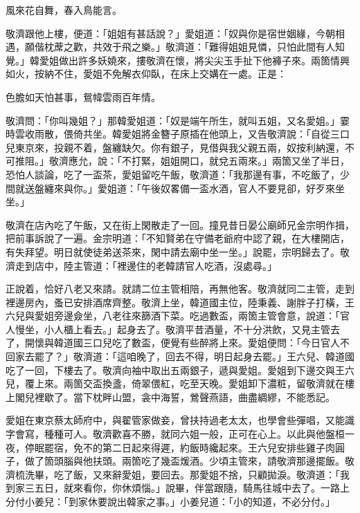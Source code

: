 \begin{myquote}
風來花自舞，春入鳥能言。
\end{myquote}

敬濟跟他上樓，便道：「姐姐有甚話說？」愛姐道：「奴與你是宿世姻緣，今朝相遇，願偕枕蓆之歡，共效于飛之樂。」敬濟道：「難得姐姐見憐，只怕此間有人知覺。」韓愛姐做出許多妖嬈來，摟敬濟在懷，{}將尖尖玉手扯下他褲子來。兩箇情興如火，按納不住，愛姐不免解衣仰臥，在床上交媾在一處。正是：

\begin{myquote}
色膽如天怕甚事，鴛幃雲雨百年情。
\end{myquote}

敬濟問：「你叫幾姐？」那韓愛姐道：「奴是端午所生，就叫五姐，又名愛姐。」霎時雲收雨散，偎倚共坐。韓愛姐將金簪子原插在他頭上，又告敬濟說：「自從三口兒東京來，投親不着，盤纏缺欠。你有銀子，見借與我父親五兩，奴按利納還，不可推阻。」敬濟應允，說：「不打緊，姐姐開口，就兌五兩來。」兩箇又坐了半日，恐怕人談論，吃了一盃茶，愛姐留吃午飯，敬濟道：「我那邊有事，不吃飯了，少間就送盤纏來與你。」愛姐道：「午後奴畧備一盃水酒，官人不要見卻，好歹來坐坐。」

敬濟在店內吃了午飯，又在街上閑散走了一回。撞見昔日晏公廟師兄金宗明作揖，把前事訴說了一遍。金宗明道：「不知賢弟在守備老爺府中認了親，在大樓開店，有失拜望。明日就使徒弟送茶來，閑中請去廟中坐一坐。」說罷，宗明歸去了。敬濟走到店中，陸主管道：「裡邊住的老韓請官人吃酒，沒處尋。」

正說着，恰好八老又來請。就請二位主管相陪，再無他客。敬濟就同二主管，走到裡邊房內，蚤已安排酒席齊整。敬濟上坐，韓道國主位，陸秉義、謝胖子打橫，王六兒與愛姐旁邊僉坐，八老往來篩酒下菜。吃過數盃，兩箇主管會意，說道：「官人慢坐，小人櫃上看去。」起身去了。敬濟平昔酒量，不十分洪飲，又見主管去了，開懷與韓道國三口兒吃了數盃，便覺有些醉將上來。愛姐便問：「今日官人不回家去罷了？」敬濟道：「這咱晚了，回去不得，明日起身去罷。」王六兒、韓道國吃了一回，下樓去了。敬濟向袖中取出五兩銀子，遞與愛姐。愛姐到下邊交與王六兒，覆上來。兩箇交盃換盞，倚翠偎紅，吃至天晚。愛姐卸下濃粧，留敬濟就在樓上閣兒裡歇了。當下枕畔山盟，衾中海誓，鶯聲燕語，曲盡綢繆，不能悉記。

愛姐在東京蔡太師府中，與翟管家做妾，曾扶持過老太太，也學會些彈唱，又能識字會寫，種種可人。敬濟歡喜不勝，就同六姐一般，正可在心上。{}以此與他盤桓一夜，停眠罷宿，免不的第二日起來得遲，約飯時纔起來。王六兒安排些雞子肉圓子，做了箇頭腦與他扶頭。兩箇吃了幾盃煖酒。少頃主管來，請敬濟那邊擺飯。敬濟梳洗畢，吃了飯，又來辭愛姐，要回去。那愛姐不捨，只顧拋淚。{}敬濟道：「我到家三五日，就來看你，你休煩惱。」說畢，伴當跟隨，騎馬往城中去了。一路上分付小姜兒：「到家休要說出韓家之事。」小姜兒道：「小的知道，不必分付。」

